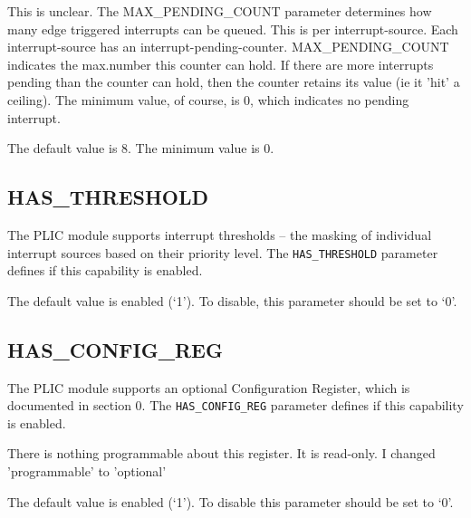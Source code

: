 \comment
This is unclear.
The MAX_PENDING_COUNT parameter determines how many edge triggered interrupts can be queued. This is per interrupt-source. Each interrupt-source has an interrupt-pending-counter. MAX_PENDING_COUNT indicates the max.number this counter can hold.
If there are more interrupts pending than the counter can hold, then the counter retains its value (ie it 'hit' a ceiling).
The minimum value, of course, is 0, which indicates no pending interrupt.
\endcomment

The default value is 8. The minimum value is 0.

\subsection{HAS\_THRESHOLD}

The PLIC module supports interrupt thresholds -- the masking of
individual interrupt sources based on their priority level. The
\texttt{HAS\_THRESHOLD} parameter defines if this capability is enabled.

The default value is enabled (`1'). To disable, this parameter should be
set to `0'.

\subsection{HAS\_CONFIG\_REG}

The PLIC module supports an optional Configuration Register, which is
documented in section 0. The \texttt{HAS\_CONFIG\_REG} parameter defines
if this capability is enabled.

\comment
There is nothing programmable about this register. It is read-only.
I changed 'programmable' to 'optional'
\endcomment

The default value is enabled (`1'). To disable this parameter should be
set to `0'.
